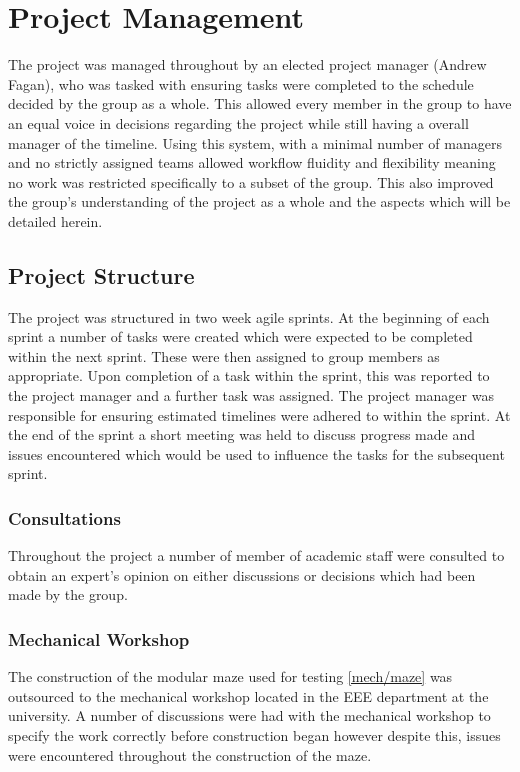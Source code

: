 
\chapter{Project Management}\label{pm}

The project was managed throughout by an elected project manager (Andrew Fagan), who was tasked with ensuring tasks were completed to the schedule decided by the group as a whole. This allowed every member in the group to have an equal voice in decisions regarding the project while still having a overall manager of the timeline. Using this system, with a minimal number of managers and no strictly assigned teams allowed workflow fluidity and flexibility meaning no work was restricted specifically to a subset of the group. This also improved the group's understanding of the project as a whole and the aspects which will be detailed herein. 

\section{Project Structure}\label{pm/structure}

The project was structured in two week agile sprints. At the beginning of each sprint a number of tasks were created which were expected to be completed within the next sprint. These were then assigned to group members as appropriate. Upon completion of a task within the sprint, this was reported to the project manager and a further task was assigned. The project manager was responsible for ensuring estimated timelines were adhered to within the sprint. At the end of the sprint a short meeting was held to discuss progress made and issues encountered which would be used to influence the tasks for the subsequent sprint. 
	

\subsection{Consultations}\label{pm/consultations}
Throughout the project a number of member of academic staff were consulted to obtain an expert's opinion on either discussions or decisions which had been made by the group. 

\subsection{Mechanical Workshop}\label{pm/mechshop}
The construction of the modular maze used for testing \ref{mech/maze} was outsourced to the mechanical workshop located in the EEE department at the university. A number of discussions were had with the mechanical workshop to specify the work correctly before construction began however despite this, issues were encountered throughout the construction of the maze. 


